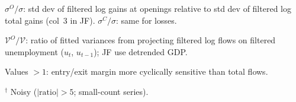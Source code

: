 \begin{table}[htbp]
\begin{tablenotes}[flushleft]
\item $\sigma^O/\sigma$: std dev of filtered log gains at openings relative to std dev of filtered log total gains (col~3 in JF). $\sigma^C/\sigma$: same for losses.
\item $\mathcal{V}^O/\mathcal{V}$: ratio of fitted variances from projecting filtered log flows on filtered unemployment ($u_t$, $u_{t-1}$); JF use detrended GDP.
\item Values $>1$: entry/exit margin more cyclically sensitive than total flows.
\item $^\dagger$ Noisy ($|\text{ratio}|>5$; small-count series).
\end{tablenotes}
\end{table}
